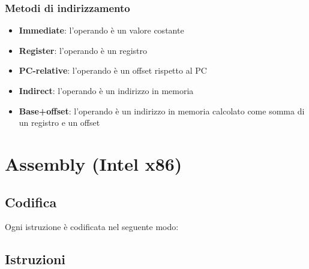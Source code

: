 \documentclass[a4paper]{article}
\theoremstyle{break}
\theoremstyle{break}
\theoremstyle{break}
\theoremstyle{break}
\begin{document}
\subsubsection{Metodi di indirizzamento}
\begin{itemize}
	\item \textbf{Immediate}: l'operando è un valore costante
	\item \textbf{Register}: l'operando è un registro
	\item \textbf{PC-relative}: l'operando è un offset rispetto al PC
	\item \textbf{Indirect}: l'operando è un indirizzo in memoria
	\item \textbf{Base+offset}: l'operando è un indirizzo in memoria calcolato come somma di un registro e un offset
\end{itemize}

\section{Assembly (Intel x86)}
\subsection{Codifica}
Ogni istruzione è codificata nel seguente modo:

\begin{figure}[H]
	\centering
\end{figure}

\subsection{Istruzioni}
\end{document}
